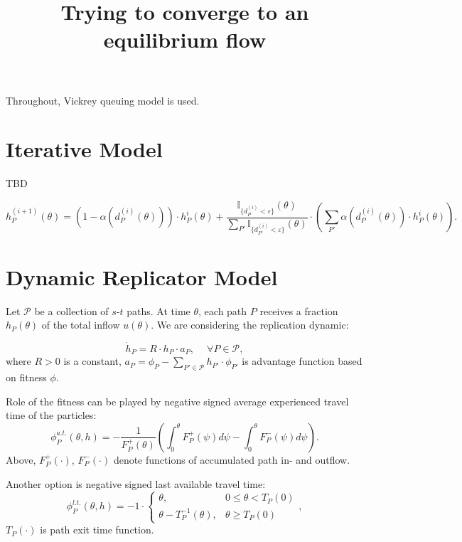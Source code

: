 \documentclass[12pt]{article}
\begin{document}
\title{Trying to converge to an equilibrium flow}
\maketitle

Throughout, Vickrey queuing model is used.

\section*{Iterative Model}

TBD

$$ h_P^{(i+1)}(\theta) = \left(1 - \alpha( d_P^{(i)}(\theta)) \right) \cdot h_P^{i}(\theta) + \frac{ \mathbb{I}_{ \{d_P^{(i)} < \varepsilon \}} (\theta) }{\sum_{P'} \mathbb{I}_{ \{d_{P'}^{(i)} < \varepsilon \}} (\theta)} \cdot \left( \sum_{P'} \alpha( d_P^{(i)}(\theta)) \cdot h_P^{i}(\theta) \right).$$


\section*{Dynamic Replicator Model}

Let $\mathcal{P}$ be a collection of $s$-$t$ paths. At time $\theta$, each path $P$ receives a fraction $h_P(\theta)$ of the total inflow $u(\theta)$. We are considering the replication dynamic: 

$$ \dot{h}_P = R \cdot h_P \cdot a_P, \quad ~\forall P \in \mathcal{P}, $$
where $R > 0$ is a constant, $a_P = \phi_P - \sum_{P' \in \mathcal{P}} h_{P'} \cdot \phi_{P'}$ is advantage function based on fitness $\phi$. 

 Role of the fitness can be played by negative signed average experienced travel time of the particles:
$$ \phi^{a.t.}_P(\theta, h) = - \frac{1} {F_P^+(\theta)} \left( \int_{0}^{\theta} F_P^+(\psi) d \psi - \int_{0}^{\theta} F_P^{-} (\psi) d \psi \right) .$$
Above, $F_P^+(\cdot)$, $F_P^-(\cdot)$ denote functions of accumulated path in- and outflow.

Another option is  negative signed last available travel time:
$$ \phi^{l.t.}_P(\theta, h) = -1 \cdot \begin{cases} \theta, & 0 \leq \theta < T_P(0) \\ \theta - T_P^{-1}(\theta), & \theta \geq T_P(0) \end{cases} ,$$
 $T_P(\cdot)$ is path exit time function.
 
\end{document}
